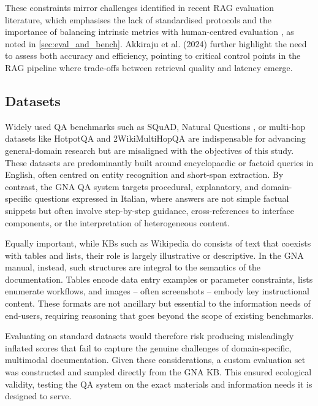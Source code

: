 \begin{spacing}{1.5}
These constraints mirror challenges identified in recent RAG evaluation literature, which emphasises the lack of standardised protocols and the importance of balancing intrinsic metrics with human-centred evaluation \citep{abeysinghe_challenges_2024}, as noted in \autoref{sec:eval_and_bench}. Akkiraju et al. (2024) further highlight the need to assess both accuracy and efficiency, pointing to critical control points in the RAG pipeline where trade-offs between retrieval quality and latency emerge.


\subsection{Datasets}\label{sec:datasets}
Widely used QA benchmarks such as SQuAD, Natural Questions \citep{kwiatkowski_natural_2019}, or multi-hop datasets like HotpotQA \citep{yang_hotpotqa_2018} and 2WikiMultiHopQA \citep{ho_constructing_2020} are indispensable for advancing general-domain research but are misaligned with the objectives of this study. These datasets are predominantly built around encyclopaedic or factoid queries in English, often centred on entity recognition and short-span extraction. By contrast, the GNA QA system targets procedural, explanatory, and domain-specific questions expressed in Italian, where answers are not simple factual snippets but often involve step-by-step guidance, cross-references to interface components, or the interpretation of heterogeneous content.

Equally important, while KBs such as Wikipedia do consists of text that coexists with tables and lists, their role is largely illustrative or descriptive. In the GNA manual, instead, such structures are integral to the semantics of the documentation. Tables encode data entry examples or parameter constraints, lists enumerate workflows, and images -- often screenshots -- embody key instructional content. These formats are not ancillary but essential to the information needs of end-users, requiring reasoning that goes beyond the scope of existing benchmarks.

Evaluating on standard datasets would therefore risk producing misleadingly inflated scores that fail to capture the genuine challenges of domain-specific, multimodal documentation. Given these considerations, a custom evaluation set was constructed and sampled directly from the GNA KB. This ensured ecological validity, testing the QA system on the exact materials and information needs it is designed to serve.\\


\end{spacing}
